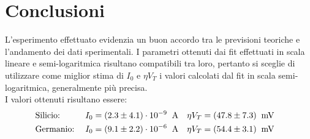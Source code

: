 \documentclass[@SRC@/main]{subfiles}
\begin{document}
\section{Conclusioni} \label{sec:conclusioni}

  L'esperimento effettuato evidenzia un buon accordo tra le previsioni teoriche e l'andamento dei dati sperimentali.
  I parametri ottenuti dai fit effettuati in scala lineare e semi-logaritmica risultano compatibili tra loro,
  pertanto si sceglie di utilizzare come miglior stima di $I_{0}$ e $\eta V_{T}$
  i valori calcolati dal fit in scala semi-logaritmica, generalmente più precisa.
  \\[2\baselineskip]
  I valori ottenuti risultano essere:
  \begin{align*}
    &\textnormal{Silicio:} \;
    &I_{0} &= (2.3 \pm 4.1)\cdot 10^{-9} \;\;\textnormal{A} &
    \eta V_{T} &= (47.8 \pm 7.3)\;\;\textnormal{mV} & \\
    &\textnormal{Germanio:} \;
    &I_{0} &= (9.1\pm 2.2) \cdot 10^{-6} \;\;\textnormal{A} &
    \eta V_{T} &= (54.4 \pm 3.1)\;\;\textnormal{mV} &
  \end{align*}
\end{document}
